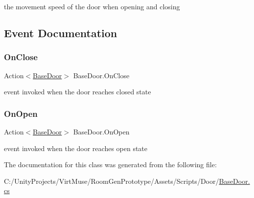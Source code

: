 the movement speed of the door when opening and closing 



\subsection{Event Documentation}
\mbox{\label{class_base_door_a382fd7054c500c9075ef67792f39eab5}} 
\subsubsection{\texorpdfstring{On\+Close}{OnClose}}
{\footnotesize\ttfamily Action$<$\mbox{\hyperlink{class_base_door}{Base\+Door}}$>$ Base\+Door.\+On\+Close}



event invoked when the door reaches closed state 

\mbox{\label{class_base_door_a88b84b3eafa96f6a3290b0aa5b55d9c0}} 
\subsubsection{\texorpdfstring{On\+Open}{OnOpen}}
{\footnotesize\ttfamily Action$<$\mbox{\hyperlink{class_base_door}{Base\+Door}}$>$ Base\+Door.\+On\+Open}



event invoked when the door reaches open state 



The documentation for this class was generated from the following file\+:\begin{DoxyCompactItemize}
\item 
C\+:/\+Unity\+Projects/\+Virt\+Muse/\+Room\+Gen\+Prototype/\+Assets/\+Scripts/\+Door/\mbox{\hyperlink{_base_door_8cs}{Base\+Door.\+cs}}\end{DoxyCompactItemize}
